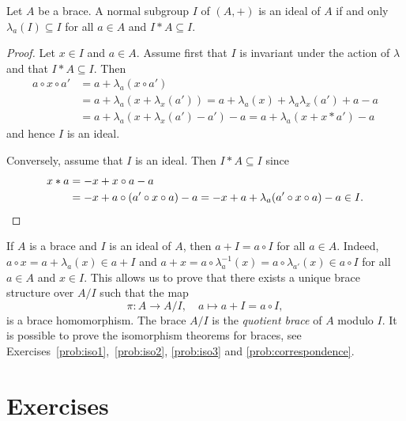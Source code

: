 \begin{proposition}
    \label{pro:I*A}
    Let $A$ be a brace. A normal subgroup $I$ of $(A,+)$
    is an ideal of $A$ if and only $\lambda_a(I)\subseteq I$ for all $a\in A$ and
    $I*A\subseteq I$.
\end{proposition}

\begin{proof}
    Let $x\in I$ and $a\in A$.  Assume first that $I$ is invariant under the
    action of $\lambda$ and that $I*A\subseteq I$. Then
    \begin{equation}
    \label{eq:trick:I*A}
        \begin{aligned}
        a\circ x\circ a' &=a+\lambda_a(x\circ a')\\
        &=a+\lambda_a(x+\lambda_x(a'))
        =a+\lambda_a(x)+\lambda_a\lambda_x(a')+a-a\\
        &=a+\lambda_a(x+\lambda_x(a')-a')-a
        =a+\lambda_a(x+x*a')-a
    \end{aligned}
    \end{equation}
    and hence $I$ is an ideal.

    Conversely, assume that $I$ is an ideal. Then $I*A\subseteq I$ since
    \begin{align*}
        x*a&=-x+x\circ a-a\\
        &=-x+a\circ(a'\circ x\circ a)-a
        =-x+a+\lambda_a(a'\circ x\circ a)-a\in I.\qedhere
    \end{align*}
\end{proof}


If $A$ is a brace and $I$ is an ideal of $A$, then $a+I=a\circ I$ for all $a\in A$. Indeed, 
$a\circ x=a+\lambda_a(x)\in a+I$ and 
$a+x=a\circ\lambda_a^{-1}(x)=a\circ\lambda_{a'}(x)\in a\circ I$ 
for all $a\in A$ and $x\in I$. 
This allows us to prove that there exists a unique brace structure over $A/I$ such that
the map 
\[
\pi\colon A\to A/I,
\quad
a\mapsto a+I=a\circ I,
\]
is a brace homomorphism. The brace $A/I$ is the \emph{quotient brace} of $A$ modulo $I$. It is possible
to prove the isomorphism theorems for braces, see Exercises~\ref{prob:iso1},~\ref{prob:iso2}, \ref{prob:iso3} and
\ref{prob:correspondence}.



\section*{Exercises}

